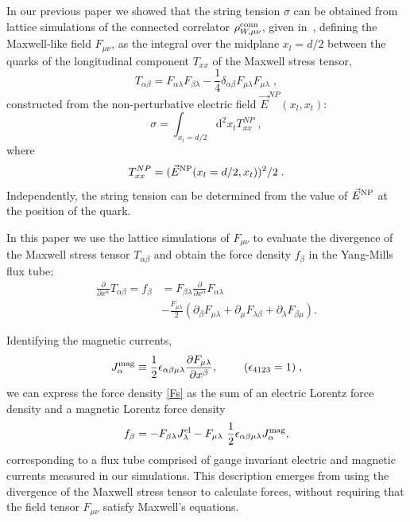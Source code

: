 \documentclass[pdftex,twocolumn,epjc3,envcountsect]{svjour3}
\begin{document}
In our previous paper \cite{Baker:2019gsi} we showed that the string tension $\sigma$ can be obtained from lattice simulations of the connected correlator $\rho^{\rm conn}_{W, \mu \nu}$, given in~, defining the Maxwell-like field $F_{\mu\nu}$, 
as the integral over the midplane  $x_l = d/2$  between the quarks of the longitudinal component $T_{xx}$ of the Maxwell stress tensor,
\begin{equation}
 T_{\alpha \beta} = F_{\alpha \lambda} F_{\beta \lambda} - \frac{1}{4} \delta_{\alpha \beta} F_{\mu \lambda} F_{\mu \lambda} \;,
 \label{stress}   
\end{equation}
constructed from the non-perturbative electric field $\vec{E}^{NP} (x_l, x_t)$: 
\begin {equation}
\sigma =  \int_{x_l = d/2}  \mathrm{d}^2 x_t T_{xx}^{NP}\;,
\label{integralT}
\end{equation}
where
\begin{equation}
T_{xx}^{NP}= (\vec{E}^{\rm NP}(x_l = d/2,  x_t))^2/2\;.
\label{maxwell}
\end{equation}
Independently, the string tension can be determined from the value of $\vec{E}^{\rm NP}$ at the position of the quark. 

In this paper we use the lattice simulations of $F_{\mu \nu}$  to evaluate the divergence of the
 Maxwell stress tensor  $T_{\alpha \beta}$ and obtain the force density $f_\beta $ in the Yang-Mills flux tube;
\begin{align}
    \frac{\partial}{\partial x^\alpha} T_{\alpha \beta} = f_\beta &= F_{\beta \lambda }  \frac{\partial}{\partial x^\alpha}F_{\alpha \lambda}\nonumber\\
     &- \frac{F_{\mu \lambda}}{2} (\partial_\beta F_{\mu \lambda} + \partial_\mu F_{\lambda \beta} + \partial_\lambda F_{\beta \mu}).
    \label{Fs}
\end{align}

Identifying the magnetic currents,
\begin{equation}
     J_\alpha^{\rm mag} \equiv \frac{1}{2} \epsilon_{\alpha \beta\mu \lambda} \frac{\partial F_{\mu \lambda}}{\partial x^\beta},~~~~~~~( \epsilon_{4123} = 1) \;,
     \label{Jmag2}
 \end{equation}
 we can express the force density \eqref{Fs}
 as the sum of an electric Lorentz force density and a magnetic Lorentz force density
\begin{align}
     f_\beta  = -F_{\beta \lambda} J^{\rm el}_\lambda  - F_{\mu \lambda} ~\frac{1}{2} \epsilon_{\alpha \beta\mu \lambda} J^{\rm mag}_\alpha, 
    \label{fdensity}
\end{align}
  corresponding to a flux tube comprised of gauge invariant electric and magnetic currents measured in our simulations. This description emerges from using the divergence of the Maxwell stress tensor
to calculate forces, without requiring that the field tensor $F_{\mu \nu}$ satisfy Maxwell's equations.
\end{document}
